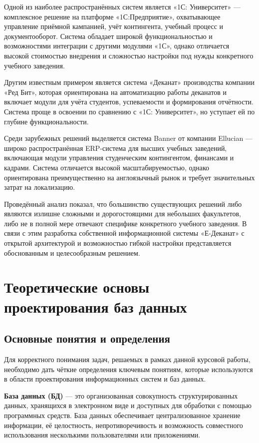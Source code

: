 \documentclass[14pt, a4paper]{extreport}
\begin{document}
Одной из наиболее распространённых систем является «1С: Университет» --- комплексное решение на платформе «1С:Предприятие», охватывающее управление приёмной кампанией, учёт контингента, учебный процесс и документооборот. Система обладает широкой функциональностью и возможностями интеграции с другими модулями «1С», однако отличается высокой стоимостью внедрения и сложностью настройки под нужды конкретного учебного заведения.

Другим известным примером является система «Деканат» производства компании «Ред Бит», которая ориентирована на автоматизацию работы деканатов и включает модули для учёта студентов, успеваемости и формирования отчётности. Система проще в освоении по сравнению с «1С: Университет», но уступает ей по глубине функциональности.

Среди зарубежных решений выделяется система Banner от компании Ellucian --- широко распространённая ERP-система для высших учебных заведений, включающая модули управления студенческим контингентом, финансами и кадрами. Система отличается высокой масштабируемостью, однако ориентирована преимущественно на англоязычный рынок и требует значительных затрат на локализацию.

Проведённый анализ показал, что большинство существующих решений либо являются излишне сложными и дорогостоящими для небольших факультетов, либо не в полной мере отвечают специфике конкретного учебного заведения. В связи с этим разработка собственной информационной системы «Е-Деканат» с открытой архитектурой и возможностью гибкой настройки представляется обоснованным и целесообразным решением.

\section{Теоретические основы проектирования баз данных}

\subsection{Основные понятия и определения}
Для корректного понимания задач, решаемых в рамках данной курсовой работы, необходимо дать чёткие определения ключевым понятиям, которые используются в области проектирования информационных систем и баз данных.

\textbf{База данных (БД)} --- это организованная совокупность структурированных данных, хранящихся в электронном виде и доступных для обработки с помощью программных средств. База данных обеспечивает централизованное хранение информации, её целостность, непротиворечивость и возможность совместного использования несколькими пользователями или приложениями.
\end{document}
